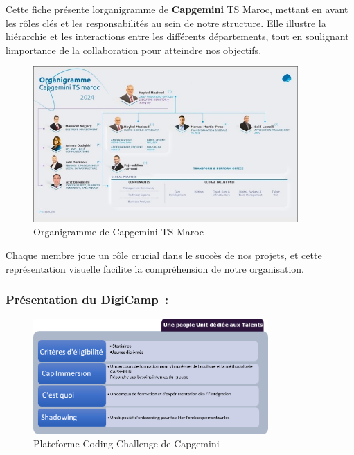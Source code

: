 \documentclass[12pt,a4paper,twoside]{report}
\begin{document}
Cette fiche présente l\textquotesingle organigramme de
\textbf{Capgemini} TS Maroc, mettant en avant les rôles clés et les
responsabilités au sein de notre structure. Elle illustre la hiérarchie
et les interactions entre les différents départements, tout en
soulignant l\textquotesingle importance de la collaboration pour
atteindre nos objectifs.

\begin{figure}[htbp]
    \centering
    \includegraphics[width=0.9\textwidth]{latex_media/media/image5.jpeg}
    \caption{Organigramme de Capgemini TS Maroc}
    \label{fig:organigramme-capgemini}
\end{figure}

Chaque membre joue un rôle crucial dans le succès de nos projets, et cette représentation visuelle facilite la compréhension de notre organisation.

\hypertarget{pruxe9sentation-du-digicamp}{%
\subsubsection{Présentation du
DigiCamp~:}\label{pruxe9sentation-du-digicamp}}

\begin{figure}[H]
\centering
\includegraphics[width=0.8\textwidth]{latex_media/media/image6.png}
\caption{Plateforme Coding Challenge de Capgemini}
\label{fig:coding-challenge-capgemini}
\end{figure}
\end{document}
